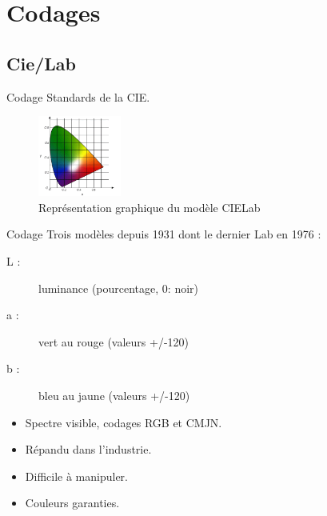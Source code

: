 \documentclass[14pt]{beamer}
\begin{document}
\section{Codages}


\subsection{Cie/Lab}
\begin{frame}{Codage \subsecname}
Standards de la CIE.%
\begin{figure}
\centering
\includegraphics[height=100px]{image_cie}
\caption{Représentation graphique du modèle CIELab}
\end{figure}
\end{frame}


\begin{frame}{Codage \subsecname}
Trois modèles depuis 1931 dont le dernier Lab en 1976 :
\begin{description}
\item[L :]luminance (pourcentage, 0: noir)
\item[a :]vert au rouge (valeurs +/-120)
\item[b :]bleu au jaune (valeurs +/-120)
\end{description}

\begin{itemize}
\item Spectre visible, codages RGB et CMJN.
\item Répandu dans l'industrie.
\item Difficile à manipuler.
\item Couleurs garanties.
\end{itemize}
\end{frame}
\end{document}
